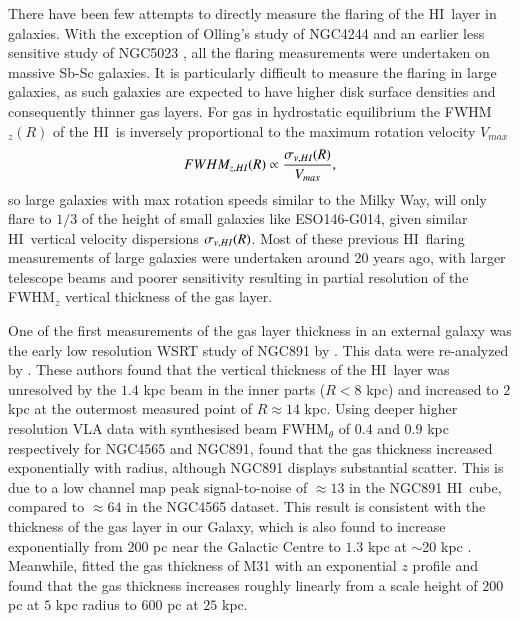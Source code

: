 \documentclass[traditabstract]{aa} %
\newcommand\HI{H{\small I}}
\begin{document}
There have been few attempts to directly measure the flaring of the
\HI\ layer in galaxies. With the exception of Olling's study of NGC4244
\citep{olling1996a} and an earlier less sensitive study of NGC5023
\citep{bsvdk1986}, all the flaring measurements were undertaken on massive
Sb-Sc galaxies. It is particularly difficult to measure the flaring in 
large galaxies,
as such galaxies are expected to have higher disk surface densities and 
consequently thinner gas layers. For gas in hydrostatic
equilibrium the FWHM$_z(R)$ of the \HI\ is inversely proportional to
the maximum rotation velocity $V_{max}$ \citep[Eqn.~(D31) of
][]{olling1995}
\begin{equation}
\label{eq:ch6-fwhmz-disp-vmax}
FWHM_{z,\HI}(R) \propto \frac{\sigma_{v,\HI}(R)}{V_{max}},
\end{equation}
so large galaxies with max rotation speeds similar to the Milky Way,
will only flare to $1/3$ of the height of small galaxies like
ESO146-G014, given similar \HI\ vertical velocity dispersions
$\sigma_{v,\HI}(R)$. Most of these previous \HI\ flaring measurements of 
large galaxies were undertaken around 20 years ago, with larger telescope 
beams and poorer sensitivity resulting in partial resolution of the FWHM$_z$ 
vertical thickness of the gas layer.

One of the first measurements of the gas layer thickness in an
external galaxy was the early low resolution WSRT study of NGC891 by
\citet{sa1979}. This data were re-analyzed by \citet{vdkruit1981}.
These authors found that the vertical thickness of the \HI\
layer was unresolved by the $1.4$ kpc beam in the inner parts ($R < 8$
kpc) and increased to $2$ kpc at the outermost measured point of $R
\approx 14$ kpc. Using deeper higher resolution VLA data with
synthesised beam FWHM$_{\theta}$ of $0.4$ and $0.9$ kpc respectively
for NGC4565 and NGC891, \citet{rupen1989} found that the gas thickness
increased exponentially with radius, although NGC891 displays
substantial scatter. This is due to a low channel map peak
signal-to-noise of $\approx13$ in the NGC891 \HI\ cube, compared to
$\approx64$ in the NGC4565 dataset. This result is consistent with the
thickness of the gas layer in our Galaxy,
which is also found to increase exponentially
from $200$ pc near the Galactic Centre to $1.3$ kpc at $\sim$20 kpc
\citep{merrifield1992}. Meanwhile, \citet{braun1991} fitted the gas
thickness of M31 with an exponential $z$ profile and found that the
gas thickness increases roughly linearly from a scale height of $200$
pc at $5$ kpc radius to $600$ pc at $25$ kpc.
\end{document}
